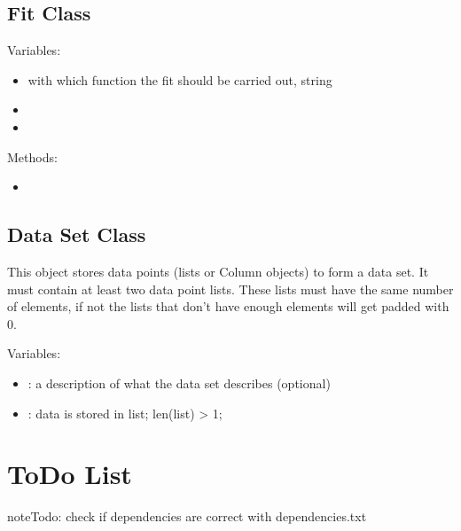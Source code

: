 \documentclass[letterpaper,10pt,english]{sphinxmanual}
\begin{document}
\section{Fit Class}
\label{\detokenize{sprints:fit-class}}
Variables:
\begin{itemize}
\item {} 
 with which function the fit should be carried out, string

\item {} 

\item {} 

\end{itemize}

Methods:
\begin{itemize}
\item {} 

\end{itemize}


\section{Data Set Class}
\label{\detokenize{sprints:data-set-class}}
This object stores data points (lists or Column objects) to form a data set. It must contain at least two data point lists. These lists must have the same number of elements, if not the lists that don’t have enough elements will get padded with 0.

Variables:
\begin{itemize}
\item {} 
: a description of what the data set describes (optional)

\item {} 
: data is stored in list; len(list) \textgreater{} 1;

\end{itemize}


\chapter{ToDo List}
\label{\detokenize{todo:todo-list}}\label{\detokenize{todo::doc}}
\begin{sphinxadmonition}{note}{Todo:}
check if dependencies are correct with dependencies.txt
\end{sphinxadmonition}
\end{document}

